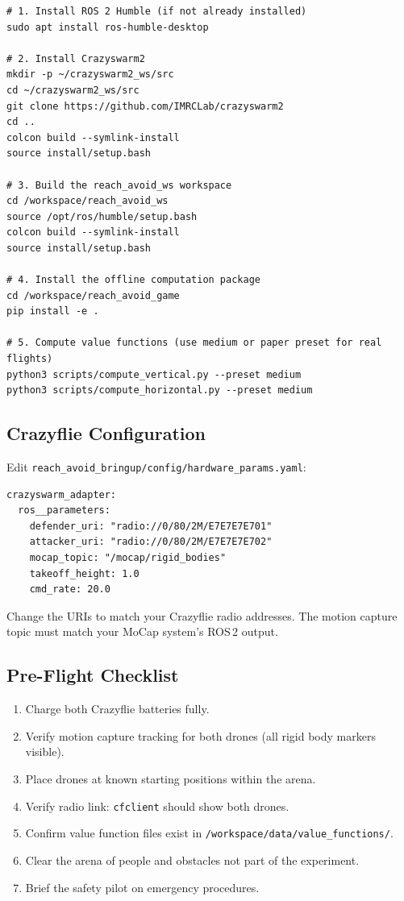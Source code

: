 \documentclass[11pt,a4paper]{article}
\begin{document}
\begin{lstlisting}[style=bashstyle]
# 1. Install ROS 2 Humble (if not already installed)
sudo apt install ros-humble-desktop

# 2. Install Crazyswarm2
mkdir -p ~/crazyswarm2_ws/src
cd ~/crazyswarm2_ws/src
git clone https://github.com/IMRCLab/crazyswarm2
cd ..
colcon build --symlink-install
source install/setup.bash

# 3. Build the reach_avoid_ws workspace
cd /workspace/reach_avoid_ws
source /opt/ros/humble/setup.bash
colcon build --symlink-install
source install/setup.bash

# 4. Install the offline computation package
cd /workspace/reach_avoid_game
pip install -e .

# 5. Compute value functions (use medium or paper preset for real flights)
python3 scripts/compute_vertical.py --preset medium
python3 scripts/compute_horizontal.py --preset medium
\end{lstlisting}

\subsection{Crazyflie Configuration}

Edit \texttt{reach\_avoid\_bringup/config/hardware\_params.yaml}:

\begin{lstlisting}[style=yamlstyle]
crazyswarm_adapter:
  ros__parameters:
    defender_uri: "radio://0/80/2M/E7E7E7E701"
    attacker_uri: "radio://0/80/2M/E7E7E7E702"
    mocap_topic: "/mocap/rigid_bodies"
    takeoff_height: 1.0
    cmd_rate: 20.0
\end{lstlisting}

Change the URIs to match your Crazyflie radio addresses. The motion capture topic must match your MoCap system's ROS\,2 output.

\subsection{Pre-Flight Checklist}

\begin{enumerate}
    \item Charge both Crazyflie batteries fully.
    \item Verify motion capture tracking for both drones (all rigid body markers visible).
    \item Place drones at known starting positions within the arena.
    \item Verify radio link: \texttt{cfclient} should show both drones.
    \item Confirm value function files exist in \texttt{/workspace/data/value\_functions/}.
    \item Clear the arena of people and obstacles not part of the experiment.
    \item Brief the safety pilot on emergency procedures.
\end{enumerate}
\end{document}
